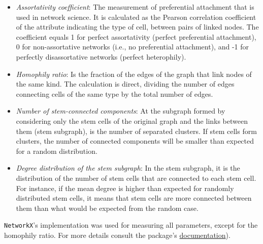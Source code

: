 \documentclass[fleqn,10pt]{wlscirep}
\begin{document}
\begin{itemize}
    \item \emph{Assortativity coefficient}: The measurement of preferential attachment that is used in network science. It is calculated as the Pearson correlation coefficient of the attribute indicating the type of cell, between pairs of linked nodes. The coefficient equals 1 for perfect assortativity (perfect preferential attachment), 0 for non-assortative networks (i.e., no preferential attachment), and -1 for perfectly disassortative networks (perfect heterophily).
    \item \emph{Homophily ratio}: Is the fraction of the edges of the graph that link nodes of the same kind. The calculation is direct, dividing the number of edges connecting cells of the same type by the total number of edges. 
    \item \emph{Number of stem-connected components}: At the subgraph formed by considering only the stem cells of the original graph and the links between them (stem subgraph), is the number of separated clusters. If stem cells form clusters, the number of connected components will be smaller than expected for a random distribution.
    \item \emph{Degree distribution of the stem subgraph}: In the stem subgraph, it is the distribution of the number of stem cells that are connected to each stem cell. For instance, if the mean degree is higher than expected for randomly distributed stem cells, it means that stem cells are more connected between them than what would be expected from the random case.
\end{itemize}
%
\lstinline{NetworkX}'s\cite{SciPyProceedings_11} implementation was used for measuring all parameters, except for the homophily ratio. For more details consult the package's \href{https://networkx.org/documentation/stable/reference/algorithms/generated/networkx.algorithms.assortativity.attribute_assortativity_coefficient.html#networkx.algorithms.assortativity.attribute_assortativity_coefficient}{documentation}). 
\end{document}
